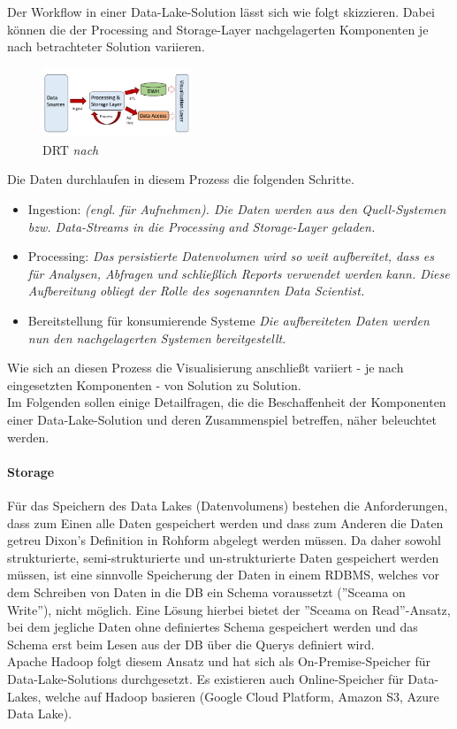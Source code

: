 \documentclass[twoside,twocolumn]{article}
\begin{document}
Der Workflow in einer Data-Lake-Solution lässt sich wie folgt skizzieren. Dabei können die der Processing and Storage-Layer nachgelagerten Komponenten je nach betrachteter Solution variieren.

\begin{figure}[h]
	\centering 
	\includegraphics[width=0.4\textwidth]{img/p4} 
	\caption{DRT \textit{nach} \cite{src9}}	
\end{figure}

Die Daten durchlaufen in diesem Prozess die folgenden Schritte.
\begin{itemize}
	\item Ingestion: \textit{(engl. für Aufnehmen). Die Daten werden aus den Quell-Systemen bzw. Data-Streams in die Processing and Storage-Layer geladen.}
	\item Processing: \textit{Das persistierte Datenvolumen wird so weit aufbereitet, dass es für Analysen, Abfragen und schließlich Reports verwendet werden kann. Diese Aufbereitung obliegt der Rolle des sogenannten Data Scientist.\cite{src8}} 
	\item Bereitstellung für konsumierende Systeme \textit{Die aufbereiteten Daten werden nun den nachgelagerten Systemen bereitgestellt.}
\end{itemize}
Wie sich an diesen Prozess die Visualisierung anschließt variiert - je nach eingesetzten Komponenten - von Solution zu Solution.\\

Im Folgenden sollen einige Detailfragen, die die Beschaffenheit der Komponenten einer Data-Lake-Solution und deren Zusammenspiel betreffen, näher beleuchtet werden.

\paragraph{Storage}
		Für das Speichern des Data Lakes (Datenvolumens) bestehen die Anforderungen, dass zum Einen alle Daten gespeichert werden und dass zum Anderen die Daten getreu Dixon's Definition in Rohform abgelegt werden müssen. Da daher sowohl strukturierte, semi-strukturierte und un-strukturierte Daten gespeichert werden müssen, ist eine sinnvolle Speicherung der Daten in einem RDBMS, welches vor dem Schreiben von Daten in die DB ein Schema voraussetzt (''Sceama on Write''), nicht möglich. Eine Lösung hierbei bietet der ''Sceama on Read''-Ansatz, bei dem jegliche Daten ohne definiertes Schema gespeichert werden und das Schema erst beim Lesen aus der DB über die Querys definiert wird.\\
		Apache Hadoop folgt diesem Ansatz und hat sich als On-Premise-Speicher für Data-Lake-Solutions durchgesetzt. Es existieren auch Online-Speicher für Data-Lakes, welche auf Hadoop basieren (Google Cloud Platform, Amazon S3, Azure Data Lake).
		\cite{src8}
\end{document}
